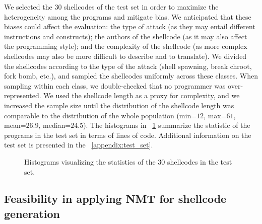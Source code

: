 We selected the 30 shellcodes of the test set in order to maximize the heterogeneity among the programs and mitigate bias. We anticipated that these biases could affect the evaluation: the type of attack (as they may entail different instructions and constructs); the authors of the shellcode (as it may also affect the programming style); and the complexity of the shellcode (as more complex shellcodes may also be more difficult to describe and to translate). We divided the shellcodes according to the type of the attack (shell spawning, break chroot, fork bomb, etc.), and sampled the shellcodes uniformly across these classes. When sampling within each class, we double-checked that no programmer was over-represented. We used the shellcode length as a proxy for complexity, and we increased the sample size until the distribution of the shellcode length was comparable to the distribution of the whole population (min=$12$, max=$61$, mean=$26.9$, median=$24.5$).
The histograms in \figurename{}~\ref{fig:test_statistic} summarize the statistic of the programs in the test set in terms of lines of code.
Additional information on the test set is presented in the \appendixname~\ref{appendix:test_set}. 

 \begin{figure}[ht]
    \centering
    \hfill
    \caption{Histograms visualizing the statistics of the  30 shellcodes in the test set.}
    \label{fig:test_statistic}
     
\end{figure}

 











\subsection{Feasibility in applying NMT for shellcode generation}
\label{subsec:RQ1}



